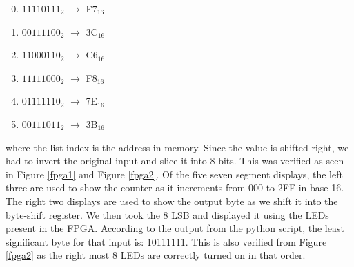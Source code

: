 \documentclass[letterpaper, 12pt]{article} %
\begin{document}
\begin{multicols}{2}
\begin{enumerate}
\setcounter{enumi}{-1}
    \item $11110111_2$ $\longrightarrow$ F$7_{16}$
    \item $00111100_2$ $\longrightarrow$ 3C$_{16}$
    \item $11000110_2$ $\longrightarrow$ C$6_{16}$
\setcounter{enumi}{764}
    \item $11111000_2$ $\longrightarrow$ F$8_{16}$
    \item $01111110_2$ $\longrightarrow$ 7E$_{16}$
    \item $00111011_2$ $\longrightarrow$ 3B$_{16}$
\end{enumerate}
\end{multicols}
where the list index is the address in memory. Since the value is shifted right, we had to invert the original input and slice it into 8 bits.
This was verified as seen in Figure \ref{fpga1} and Figure \ref{fpga2}. Of the five seven segment displays, the left three are used to show the counter as it increments from 000 to 2FF in base 16. The right two displays are used to show the output byte as we shift it into the byte-shift register. We then took the 8 LSB and displayed it using the LEDs present in the FPGA. According to the output from the python script, the least significant byte for that input is: 10111111. This is also verified from Figure \ref{fpga2} as the right most 8 LEDs are correctly turned on in that order.\par
\end{document}
